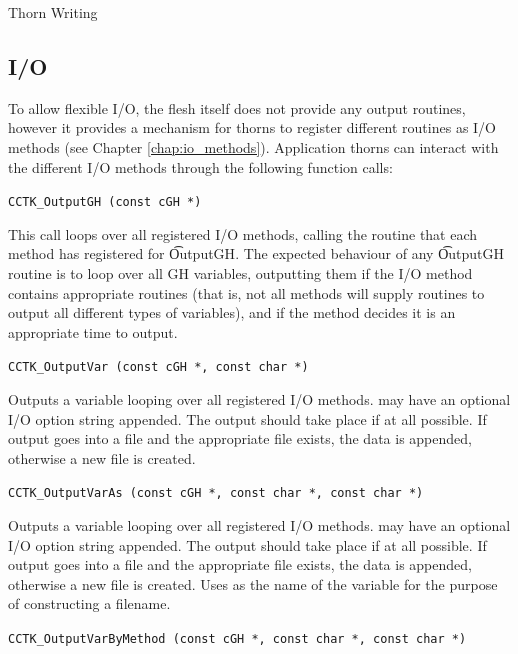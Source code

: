 \begin{cactuspart}{Thorn Writing}

\subsection{I/O}
\label{sec:io}

To allow flexible I/O, the flesh itself does not provide any output
routines, however it provides a mechanism for thorns to register
different routines as I/O methods (see Chapter \ref{chap:io_methods}).
Application thorns can interact with the different I/O methods through
the following function calls:

\begin{description}

\item \texttt{CCTK\_OutputGH (const cGH *)}

This call loops over all registered I/O methods, calling the routine
that each method has registered for {\t OutputGH}.  The expected
behaviour of any {\t OutputGH} routine is to loop over all GH
variables, outputting them if the I/O method contains appropriate
routines (that is, not all methods will supply routines to output all
different types of variables), and if the method decides it is an
appropriate time to output.

\item \texttt{CCTK\_OutputVar (const cGH *, const char *)}

Outputs a variable  looping over all registered I/O methods.
 may have an optional I/O option string appended.
The output should take place if at all possible.  If output goes into
a file and the appropriate file exists, the data is appended, otherwise
a new file is created.

\item \texttt{CCTK\_OutputVarAs (const cGH *, const char *, const char *)}

Outputs a variable  looping over all registered I/O methods.
 may have an optional I/O option string appended.
The output should take place if at all possible.  If output goes into
a file and the appropriate file exists, the data is appended, otherwise
a new file is created.  Uses  as the name of the variable
for the purpose of constructing a filename.

\item \texttt{CCTK\_OutputVarByMethod (const cGH *, const char *, const char *)}


\end{description}
\end{cactuspart}
